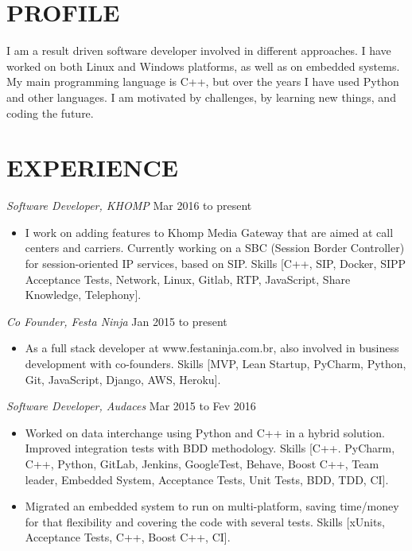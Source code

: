 \documentclass[line,margin]{res}
\begin{document}
\address{alvarofleith@gmail.com or +64 (09) 889-3534}
\address{https://linkedin.com/in/alvarofleith}


\begin{resume}

\section{PROFILE}       I am a result driven software developer involved in different approaches. I have worked on both Linux and Windows platforms, as well as on embedded systems. My main programming language is C++, but over the years I have used Python and other languages. I am motivated by challenges, by learning new things, and coding the future.


 \section{EXPERIENCE} {\sl Software Developer, KHOMP} \hfill Mar 2016 to present \\
                 \begin{itemize}  \itemsep -2pt
                 \item I work on adding features to Khomp Media Gateway that are aimed at call centers and carriers. Currently working on a SBC (Session Border Controller) for session-oriented IP services, based on SIP. Skills [C++, SIP, Docker, SIPP Acceptance Tests, Network, Linux, Gitlab, RTP, JavaScript, Share Knowledge, Telephony].
                \end{itemize}

                {\sl Co Founder, Festa Ninja} \hfill Jan 2015 to present \\
                 \begin{itemize}  \itemsep -2pt
                 \item As a full stack developer at www.festaninja.com.br, also involved in business development with co-founders. Skills [MVP, Lean Startup, PyCharm, Python, Git, JavaScript, Django, AWS, Heroku].
                 \end{itemize}

                {\sl Software Developer, Audaces} \hfill Mar 2015 to Fev 2016 \\
                  \begin{itemize}
                    \item Worked on data interchange using Python and C++ in a hybrid solution. Improved integration tests with BDD methodology. Skills [C++. PyCharm, C++, Python, GitLab, Jenkins, GoogleTest, Behave, Boost C++, Team leader, Embedded System, Acceptance Tests, Unit Tests, BDD, TDD, CI].
                    \item Migrated an embedded system to run on multi-platform, saving time/money for that flexibility and covering the code with several tests. Skills [xUnits, Acceptance Tests, C++, Boost C++, CI].
                   \end{itemize}


\end{resume}
\end{document}
